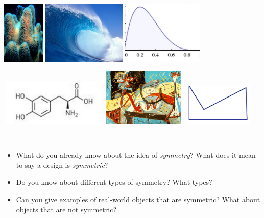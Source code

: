 \begin{center}
\includegraphics[height=3cm]{asymm1}
\qquad
\includegraphics[height=3cm]{asymm2}
\qquad
\includegraphics[height=3cm]{asymm4}



\includegraphics[height=2.2cm]{asymm3}
\ 
\includegraphics[height=2.7cm]{asymm5}
\ 
\includegraphics[height=2cm]{asymm6}
\end{center}

\bigskip


\begin{thinkpair*}\ 
\begin{itemize}
\item
What do you already know about the idea of \emph{symmetry}?  What does it mean to say a design is \emph{symmetric}?\\  
\item
Do you know about different types of symmetry?  What types?\\
\item
 Can you give examples of real-world objects that are symmetric?  What about objects that  are not symmetric?
 \end{itemize}
\end{thinkpair*}

